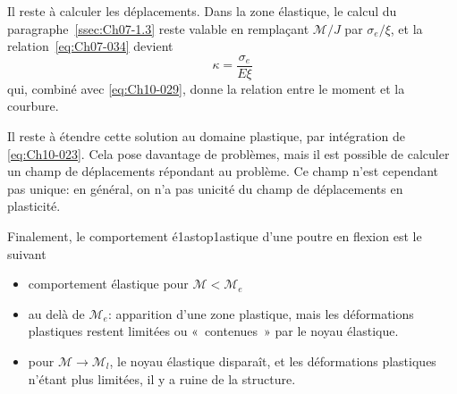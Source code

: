 Il reste à calculer les déplacements.
Dans la zone élastique, le calcul du paragraphe~\ref{ssec:Ch07-1.3} reste valable en remplaçant $\mathcal{M}/J$ par $\sigma_e/\xi$, et la relation~\eqref{eq:Ch07-034} devient 
\begin{equation}
    \kappa = \frac{\sigma_e}{E \xi}
    \label{eq:Ch10-031}
\end{equation}
qui, combiné avec \eqref{eq:Ch10-029}, donne la relation entre le moment et la courbure. 

\begin{center}
\end{center}

Il reste à étendre cette solution au domaine plastique, par intégration de \eqref{eq:Ch10-023}.
Cela pose davantage de problèmes, mais il est possible de calculer un champ de déplacements répondant au problème.
Ce champ n'est ce­pendant pas unique: en général, on n'a pas unicité du champ de déplacements en plasticité. 

Finalement, le comportement é1astop1astique d'une poutre en flexion est le suivant 
\begin{itemize}
    \item comportement élastique pour $\mathcal{M}<\mathcal{M}_e$
    \item au delà de $\mathcal{M}_e$: apparition d'une zone plastique, mais les déformations plastiques restent limitées ou «~contenues~» par le noyau élastique. 
    \item pour $\mathcal{M} \rightarrow \mathcal{M}_l$, le noyau élastique disparaît, et les déformations plastiques n'étant plus limitées, il y a ruine de la structure. 
\end{itemize}

